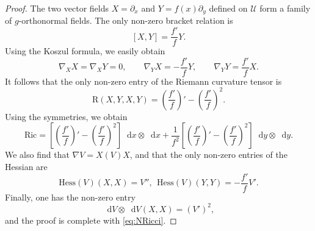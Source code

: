 \documentclass[11pt,twoside,a4paper]{article}
\newcommand{\red}{\color{red}}
\newcommand{\blue}{\color{blue}}
\newcommand*\diff{\mathop{}\!\mathrm{d}}
\newcommand{\R}{\mathbb{R}}
\newcommand{\Ric}{\mathrm{Ric}}
\newcommand{\m}{\mathfrak m} %
\newcommand{\hes}{\mathrm{Hess}}
\theoremstyle{theorem}
\theoremstyle{definition}
\theoremstyle{remark}
\theoremstyle{proof}
\begin{document}
\begin{proof}
The two vector fields $X = \partial_x$ and $Y = f(x) \partial_y$ defined on $\mathcal{U}$ form a family of $g$-orthonormal fields. The only non-zero bracket relation is
\[
[X, Y] = \frac{f'}{f} Y.
\]
Using the Koszul formula, we easily obtain
\[
\nabla_X X = \nabla_X Y = 0, \qquad \nabla_Y X = - \frac{f'}{f} Y, \qquad \nabla_Y Y = \frac{f'}{f} X.
\]
It follows that the only non-zero entry of the Riemann curvature tensor is
\[
\mathrm{R}(X, Y, X, Y) = \left(\frac{f'}{f}\right)' - \left(\frac{f'}{f}\right)^2.
\]
Using the symmetries, we obtain
\[
\mathrm{Ric} = \left[\left(\frac{f'}{f}\right)' - \left(\frac{f'}{f}\right)^2\right] \diff x \otimes \diff x + \frac{1}{f^2}\left[\left(\frac{f'}{f}\right)' - \left(\frac{f'}{f}\right)^2\right] \diff y \otimes \diff y.
\]
We also find that $\nabla V =X(V)X$, and that the only non-zero entries of the Hessian are
\[\hes(V)(X,X) = V'',~~\hes(V)(Y,Y)=-\frac{f'}{f}V'.\]
Finally, one has the non-zero entry
\[\diff V\otimes \diff V(X,X)=(V')^2,\]
and the proof is complete with \cref{eq:NRicci}.
\end{proof}

\end{document}
